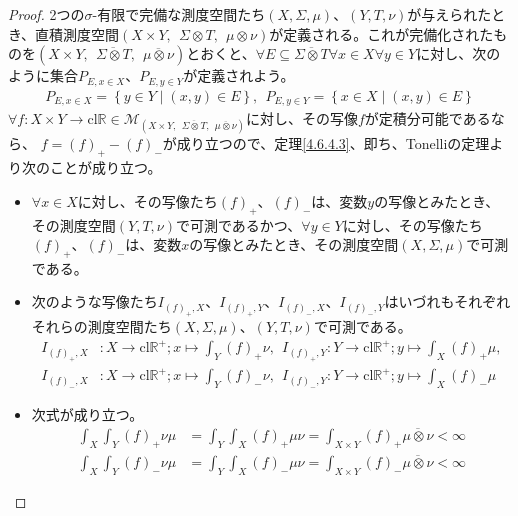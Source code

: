\documentclass[dvipdfmx]{jsarticle}
\begin{document}
\begin{proof}
2つの$\sigma$-有限で完備な測度空間たち$(X,\varSigma,\mu)$、$(Y,T,\nu)$が与えられたとき、直積測度空間$(X \times Y,\ \ \varSigma \otimes T,\ \ \mu \otimes \nu)$が定義される。これが完備化されたものを$\left( X \times Y,\ \ \overline{\varSigma \otimes T},\ \ \overline{\mu \otimes \nu} \right)$とおくと、$\forall E \subseteq \overline{\varSigma \otimes T}\forall x \in X\forall y \in Y$に対し、次のように集合$P_{E,x \in X}$、$P_{E,y \in Y}$が定義されよう。
\begin{align*}
P_{E,x \in X} = \left\{ y \in Y \middle| (x,y) \in E \right\},\ \ P_{E,y \in Y} = \left\{ x \in X \middle| (x,y) \in E \right\}
\end{align*}
$\forall f:X \times Y \rightarrow \mathrm{cl}\mathbb{R} \in \mathcal{M}_{\left( X \times Y,\ \ \overline{\varSigma \otimes T},\ \ \overline{\mu \otimes \nu} \right)}$に対し、その写像$f$が定積分可能であるなら、
$f = (f)_{+} - (f)_{-}$が成り立つので、定理\ref{4.6.4.3}、即ち、Tonelliの定理より次のことが成り立つ。
\begin{itemize}
\item
  $\forall x \in X$に対し、その写像たち$(f)_{+}$、$(f)_{-}$は、変数$y$の写像とみたとき、その測度空間$(Y,T,\nu)$で可測であるかつ、$\forall y \in Y$に対し、その写像たち$(f)_{+}$、$(f)_{-}$は、変数$x$の写像とみたとき、その測度空間$(X,\varSigma,\mu)$で可測である。
\item
  次のような写像たち$I_{(f)_{+},X}$、$I_{(f)_{+},Y}$、$I_{(f)_{-},X}$、$I_{(f)_{-},Y}$はいづれもそれぞれそれらの測度空間たち$(X,\varSigma,\mu)$、$(Y,T,\nu)$で可測である。
\begin{align*}
I_{(f)_{+},X}&:X \rightarrow \mathrm{cl}\mathbb{R}^{+};x \mapsto \int_{Y} {(f)_{+}\nu},\ \ I_{(f)_{+},Y}:Y \rightarrow \mathrm{cl}\mathbb{R}^{+};y \mapsto \int_{X} {(f)_{+}\mu},\\
I_{(f)_{-},X}&:X \rightarrow \mathrm{cl}\mathbb{R}^{+};x \mapsto \int_{Y} {(f)_{-}\nu},\ \ I_{(f)_{-},Y}:Y \rightarrow \mathrm{cl}\mathbb{R}^{+};y \mapsto \int_{X} {(f)_{-}\mu}
\end{align*}
\item
  次式が成り立つ。
\begin{align*}
\int_{X} {\int_{Y} {(f)_{+}\nu}\mu} &= \int_{Y} {\int_{X} {(f)_{+}\mu}\nu} = \int_{X \times Y} {(f)_{+}\overline{\mu \otimes \nu}} < \infty\\
\int_{X} {\int_{Y} {(f)_{-}\nu}\mu} &= \int_{Y} {\int_{X} {(f)_{-}\mu}\nu} = \int_{X \times Y} {(f)_{-}\overline{\mu \otimes \nu}} < \infty
\end{align*}

\end{itemize}
\end{proof}
\end{document}
